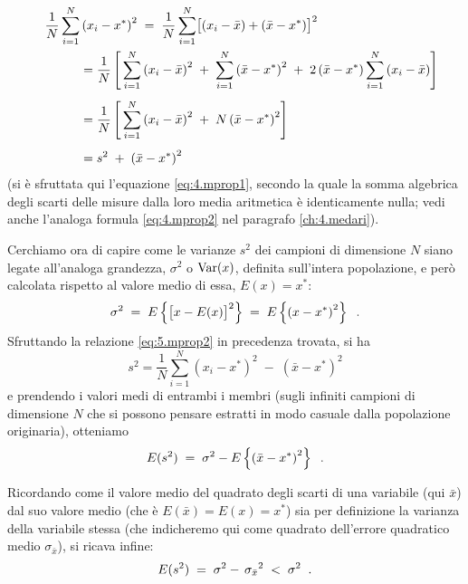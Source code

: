 \begin{equation} \label{eq:5.mprop2}
  \begin{split}
    \quad \frac{1}{N} \sum_{i=1}^N &\left( x_i - x^*
      \right) ^2 \; = \; \frac{1}{N} \sum_{i=1}^N
      \bigl[ \left( x_i - \bar x \right)
      + \left( \bar x - x^* \right) \bigr] ^2 \\
    &= \frac{1}{N} \left[ \,
      \sum_{i=1}^N \left( x_i - \bar x \right) ^2
      \; + \; \sum_{i=1}^N \left( \bar x - x^* \right)
      ^2 \; + \; 2 \left( \bar x - x^* \right)
      \sum_{i=1}^N \left( x_i - \bar x \right)
      \right] \\[1ex]
    &= \frac{1}{N} \left[ \,
      \sum_{i=1}^N \left( x_i - \bar x \right) ^2
      \; + \; N \left( \bar x - x^* \right) ^2
      \right] \\[1ex]
    &= s^2 \; + \; \left( \bar x - x^* \right) ^2
  \end{split} \raisetag{15pt}
\end{equation}
(si \`e sfruttata qui l'equazione \eqref{eq:4.mprop1},
secondo la quale la somma algebrica degli scarti delle
misure dalla loro media aritmetica \`e identicamente nulla;
vedi anche l'analoga formula \eqref{eq:4.mprop2} nel
paragrafo \ref{ch:4.medari}).

Cerchiamo ora di capire come le varianze $s^2$ dei campioni
di dimensione $N$ siano legate all'analoga grandezza,
$\sigma^{2}$ o $\operatorname{Var}(x)$, definita sull'intera popolazione,
e per\`o calcolata rispetto al valore medio di essa, $E(x) =
x^{*}$:
\begin{equation*}
  \sigma^{2} \; = \; E \left \{ \bigl[ x - E(x)
    \bigr]^2 \right\} \; = \; E \left \{ \left( x -
    x^{*} \right) ^{2} \right \} \;\; .
\end{equation*}
Sfruttando la relazione \eqref{eq:5.mprop2} in precedenza
trovata, si ha
\begin{equation*}
  s^2 = \frac{1}{N} \sum_{i=1}^N \left( x_i -
    x^* \right) ^2 \; - \; \left( \bar x
    - x^* \right) ^2
\end{equation*}
e prendendo i valori medi di entrambi i membri (sugli
infiniti campioni di dimensione $N$ che si possono pensare
estratti in modo casuale dalla popolazione originaria),
otteniamo
\begin{equation*}
  E ( s^2 ) \; = \; \sigma^2 - E
  \left \{ \left( \bar x - x^* \right) ^2
  \right \} \;\; .
\end{equation*}

Ricordando come il valore medio del quadrato degli scarti di
una variabile (qui $\bar x$) dal suo valore medio (che \`e
$E(\bar x) = E(x) = x^*$) sia per definizione la varianza
della variabile stessa (che indicheremo qui come quadrato
dell'errore quadratico medio $\sigma_{\bar x}$), si ricava
infine:
\begin{equation} \label{eq:5.esssss}
  E ( s^2 ) \; = \; \sigma^2 - \,
  {\sigma_{\bar x}}^2 \; < \; \sigma^2 \;\; .
\end{equation}

